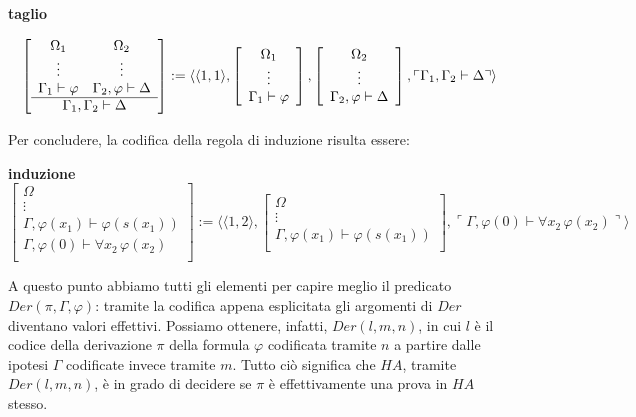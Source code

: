 \vspace{0,5cm}

\textbf{taglio}

$$
\left [
\begin{array}{cc}
\Omega_1 & \Omega_2 \\
\vdots & \vdots\\
\Gamma_1 \vdash \varphi & \Gamma_2, \varphi \vdash \Delta\\
\hline
\multicolumn{2}{c}{\Gamma_1, \Gamma_2 \vdash \Delta}\\
\end{array}
\right ]
:= \langle \langle 1, 1 \rangle ,
\left [
\begin{array}{c}
\Omega_1\\
\vdots\\
\Gamma_1 \vdash \varphi\\
\end{array}
\right ],
\left [
\begin{array}{c}
\Omega_2\\
\vdots\\
\Gamma_2, \varphi \vdash \Delta\\
\end{array}
\right],
\ulcorner \Gamma_1, \Gamma_2 \vdash \Delta \urcorner \rangle
$$



Per concludere, la codifica della regola di induzione risulta essere:


\vspace{0.5cm}
\textbf{induzione}
{\tiny
$$
\left [
\begin{array}{c}
\Omega\\
\vdots\\
\Gamma, \varphi(x_1) \vdash \varphi(s(x_1))\\
\hline
\Gamma, \varphi(0) \vdash \forall x_2\,\varphi(x_2)\\
\end{array}
\right ]
:= \langle \langle 1, 2 \rangle ,
\left [
\begin{array}{c}
\Omega\\
\vdots\\
\Gamma, \varphi(x_1) \vdash \varphi(s(x_1))\\
\end{array}
\right ],
\ulcorner \Gamma, \varphi(0) \vdash \forall x_2\,\varphi(x_2) \urcorner \rangle
$$}

\vspace{0.5cm}

A questo punto abbiamo tutti gli elementi per capire meglio il predicato  $Der(\pi,\Gamma,\varphi)$: tramite la codifica appena esplicitata gli argomenti di $Der$ diventano valori effettivi. Possiamo ottenere, infatti, $Der(l, m, n)$, in cui $l$ \`e il codice della derivazione $\pi$ della formula $\varphi$ codificata tramite $n$ a partire dalle ipotesi $\Gamma$ codificate invece tramite $m$.
Tutto ci\`o significa che $HA$, tramite $Der(l,m,n)$, \`e in grado di decidere se $\pi$ \`e effettivamente una prova in $HA$ stesso.

